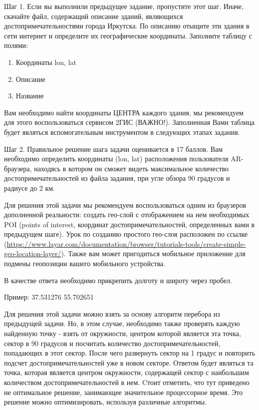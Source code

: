 
Шаг 1. Если вы выполнили предыдущее задание, пропустите этот шаг. Иначе, скачайте файл, содержащий описание зданий, являющихся достопримечательностями города Иркутска. По описанию отыщите эти здания в сети интернет и определите их географические координаты. Заполните таблицу с полями:

\begin{enumerate}
    \item Координаты lon, lat
    \item Описание
    \item Название
\end{enumerate}

Вам необходимо найти координаты ЦЕНТРА каждого здания, мы рекомендуем для этого воспользоваться сервисом 2ГИС (ВАЖНО!). Заполненная Вами таблица будет являться вспомогательным инструментом в следующих этапах задания.

Шаг 2. Правильное решение шага задачи оценивается в 17 баллов.  Вам необходимо определить координаты (lon, lat) расположения пользователя AR-браузера, находясь в котором он сможет видеть максимальное количество достопримечательностей из файла задания, при угле обзора 90 градусов и радиусе до 2 км.

Для решения этой задачи мы рекомендуем воспользоваться одним из браузеров дополненной реальности: создать гео-слой с отображением на нем необходимых POI (points of interest, координат достопримечательностей, определенных вами в предыдущем шаге). Урок по созданию простого гео-слоя 
расположен по ссылке (\url{https://www.layar.com/documentation/browser/tutorials-tools/create-simple-geo-lo}\linebreak \url{cation-layer/}). Также вам может пригодиться мобильное приложение для подмены геопозиции вашего мобильного устройства.

В качестве ответа необходимо прикрепить долготу и широту через пробел.

Пример:  37.531276 55.702651

\solutionSection

Для решения этой задачи можно взять за основу алгоритм перебора из предыдущей задачи. Но, в этом случае, необходимо также проверять каждую найденную точку - взять от окружности, центром которой является эта точка, сектор в 90 градусов и посчитать количество достопримечательностей, попадающих в этот сектор. После чего развернуть сектор на 1 градус и повторить подсчет достопримечательностей уже в новом секторе. Ответом будет являться та точка, которая является центром окружности, содержащей сектор с наибольшим количеством достопримечательностей в нем. Cтоит отметить, что тут приведено не оптимальное решение, занимающее значительное процессорное время. Это решение можно оптимизировать, используя различные алгоритмы.

